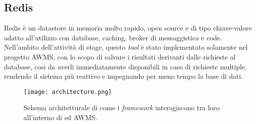 \subsection{Redis}
Redis è un datastore in memoria molto rapido, \gls{open source} e di tipo chiave-valore adatto all'utilizzo con database, caching, broker di messaggistica e code.\\
Nell'ambito dell'attività di stage, questo \textit{tool} è stato implementato solamente nel progetto AWMS, con lo scopo di salvare i risultati derivanti dalle richieste al database, così da averli immediatamente disponibili in caso di richieste multiple, rendendo il sistema più reattivo e impegnando per meno tempo la base di dati.

\begin{figure}[h]
\texttt{[image: architecture.png]}
\centering
\caption{Schema architetturale di come i \textit{\gls{framework}} interagiscono tra loro all'interno di \DS{} ed AWMS.} 
\label{fig:architecture}
\end{figure}

